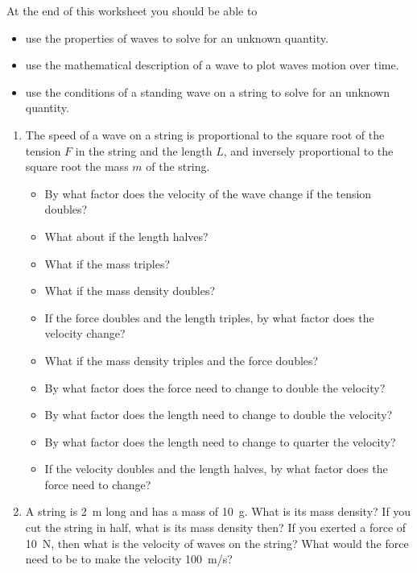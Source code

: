 At the end of this worksheet you should be able to  
\begin{itemize}
	\item use the properties of waves to solve for an unknown quantity.
	\item use the mathematical description of a wave to plot waves motion over time.
	\item use the conditions of a standing wave on a string to solve for an unknown quantity.
\end{itemize}


\begin{enumerate}
	\setlength\itemsep{2 in}
	
	\item
	The speed of a wave on a string is proportional to the square root of the tension $F$ in the string and the length $L$, and inversely proportional to the square root the mass $m$ of the string.
	\begin{itemize}
		\setlength\itemsep{1 in}
		\item By what factor does the velocity of the wave change if the tension doubles?
		\item What about if the length halves?
		\item What if the mass triples?
		\item What if the mass density doubles?
		\item If the force doubles and the length triples, by what factor does the velocity change?
		\item What if the mass density triples and the force doubles?
		\item By what factor does the force need to change to double the velocity?
		\item By what factor does the length need to change to double the velocity?
		\item By what factor does the length need to change to quarter the velocity? 
		\item If the velocity doubles and the length halves, by what factor does the force need to change?
	\end{itemize}
	
	\item
	A string is \SI{2}{m} long and has a mass of \SI{10}{g}. What is its mass density? If you cut the string in half, what is its mass density then? If you exerted a force of \SI{10}{N}, then what is the velocity of waves on the string? What would the force need to be to make the velocity \SI{100}{m/s}? 
	

\end{enumerate}
